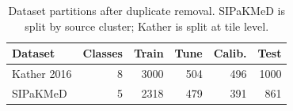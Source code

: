\begin{table}[t]
\centering
\caption{Dataset partitions after duplicate removal. SIPaKMeD is split by source cluster; Kather is split at tile level.}
\label{tab:data}
\small
\setlength{\tabcolsep}{4pt}
\begin{tabular}{lrrrrr}
\toprule
Dataset & Classes & Train & Tune & Calib. & Test \\
\midrule
Kather 2016 & 8 & 3000 & 504 & 496 & 1000 \\
SIPaKMeD & 5 & 2318 & 479 & 391 & 861 \\
\bottomrule
\end{tabular}
\end{table}
